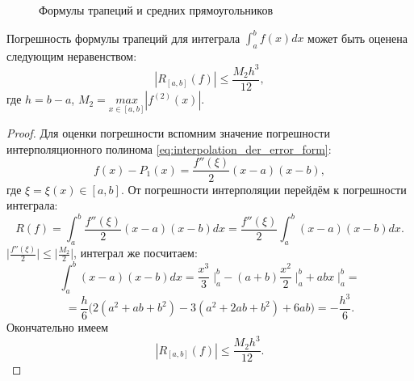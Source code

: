 \documentclass[../main.tex]{subfile}
\begin{document}
\begin{figure}[ht]
	\caption*{Формулы трапеций и средних прямоугольников}
\end{figure}

\begin{theorem}
\label{eq:trapezoidal_rule_error}
	Погрешность формулы трапеций для интеграла $\int_a^b f(x)dx$ может быть
	оценена следующим неравенством:
	\[\boxed{|R_{[a,b]}(f)|\le\frac{M_2h^3}{12}},\]
	где $h=b-a$, $M_2=\underset{x\in[a,b]}{max}|f^{(2)}(x)|.$
\end{theorem}

\begin{proof}
	Для оценки погрешности вспомним значение погрешности интерполяционного
	полинома \eqref{eq:interpolation_der_error_form}:
	\[f(x)-P_1(x)=\frac{f''(\xi)}{2}(x-a)(x-b),\]
	где $\xi=\xi(x)\in[a,b]$. От погрешности интерполяции перейдём к
	погрешности интеграла:
	\[R(f)=\int_a^b\frac{f''(\xi)}{2}(x-a)(x-b)dx=\frac{f''(\xi)}{2}\int_a^b
	(x-a)(x-b)dx.\]
	$\big|\frac{f''(\xi)}{2}\big|\le\big|\frac{M_2}{2}\big|$, интеграл же
	посчитаем:
	\[\int_a^b(x-a)(x-b)dx=\frac{x^3}{3}\;\Big|_a^b-(a+b)\frac{x^2}{2}\;
	\Big|_a^b+abx\;\Big|_a^b=\]
	\[=\frac{h}{6}\Big(2(a^2+ab+b^2)-3(a^2+2ab+b^2)+6ab\Big)=-\frac{h^3}{6}.
	\]
	Окончательно имеем
	\[|R_{[a,b]}(f)|\le\frac{M_2h^3}{12}.\]
\end{proof}
\end{document}
